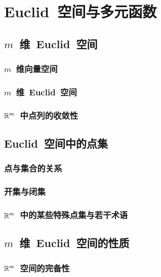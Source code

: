 

\chapter{Euclid~空间与多元函数}\label{ch:15}
\section{$m$~维~Euclid~空间}
\subsection{$m$~维向量空间}
\subsection{$m$~维~Euclid~空间}
\subsection{$\mathbb{R}^m$~中点列的收敛性}
\begin{exercise}
\item
\end{exercise}
\section{Euclid~空间中的点集}
\subsection{点与集合的关系}
\subsection{开集与闭集}
\subsection{$\mathbb{R}^m$~中的某些特殊点集与若干术语}
\begin{exercise}
\item
\end{exercise}
\section{$m$~维~Euclid~空间的性质}
\subsection{$\mathbb{R}^m$~空间的完备性}
